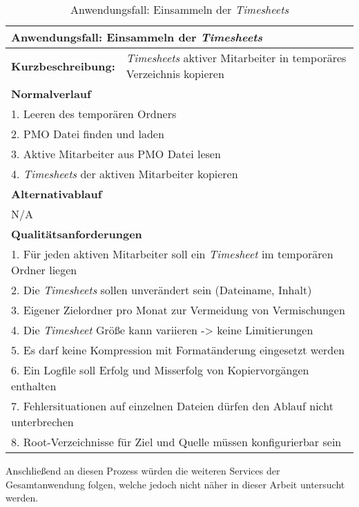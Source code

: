 \begin{table}[H]
    \begin{tabular}[H]{|l|l|}
        \hline
        \multicolumn{2}{|l|}{\textbf{Anwendungsfall:} Einsammeln der \textit{\glspl{Timesheet}}} \\
        \hline
        \textbf{Kurzbeschreibung:} & \textit{\glspl{Timesheet}} aktiver Mitarbeiter in temporäres Verzeichnis kopieren \\
        \hline
        \multicolumn{2}{|l|}{\textbf{Normalverlauf}} \\
        \hline
        \multicolumn{2}{|l|}{1. Leeren des temporären Ordners} \\
        \multicolumn{2}{|l|}{2. PMO Datei finden und laden} \\
        \multicolumn{2}{|l|}{3. Aktive Mitarbeiter aus PMO Datei lesen} \\
        \multicolumn{2}{|l|}{4. \textit{\glspl{Timesheet}} der aktiven Mitarbeiter kopieren} \\
        \hline
        \multicolumn{2}{|l|}{\textbf{Alternativablauf}} \\
        \hline
        \multicolumn{2}{|l|}{N/A} \\
        \multicolumn{2}{|l|}{\textbf{Qualitätsanforderungen}} \\
        \hline
        \multicolumn{2}{|l|}{1. Für jeden aktiven Mitarbeiter soll ein \textit{\gls{Timesheet}} im temporären Ordner liegen} \\
        \multicolumn{2}{|l|}{2. Die \textit{\glspl{Timesheet}} sollen unverändert sein (Dateiname, Inhalt)} \\
        \multicolumn{2}{|l|}{3. Eigener Zielordner pro Monat zur Vermeidung von Vermischungen} \\
        \multicolumn{2}{|l|}{4. Die \textit{\gls{Timesheet}} Größe kann variieren -> keine Limitierungen} \\
        \multicolumn{2}{|l|}{5. Es darf keine Kompression mit Formatänderung eingesetzt werden} \\
        \multicolumn{2}{|l|}{6. Ein Logfile soll Erfolg und Misserfolg von Kopiervorgängen enthalten} \\
        \multicolumn{2}{|l|}{7. Fehlersituationen auf einzelnen Dateien dürfen den Ablauf nicht unterbrechen} \\
        \multicolumn{2}{|l|}{8. Root-Verzeichnisse für Ziel und Quelle müssen konfigurierbar sein} \\
        \hline
    \end{tabular}
    \caption{Anwendungsfall: Einsammeln der \textit{\glspl{Timesheet}}}
    \label{tab:use-case-analyse-timesheets}
\end{table}

Anschließend an diesen Prozess würden die weiteren Services der Gesamtanwendung folgen, welche jedoch nicht näher in dieser Arbeit untersucht werden.